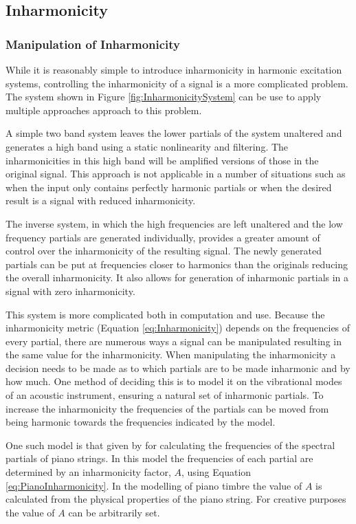 	\subsection{Inharmonicity}
	\label{sec:FeatureControl-Parameterisation-Inharmonicity}
		\subsubsection*{Manipulation of Inharmonicity}
			While it is reasonably simple to introduce inharmonicity in harmonic excitation systems,
			controlling the inharmonicity of a signal is a more complicated problem. The system shown in Figure
			\ref{fig:InharmonicitySystem} can be use to apply multiple approaches approach to this problem. 

			A simple two band system leaves the lower partials of the system unaltered and generates a high
			band using a static nonlinearity and filtering. The inharmonicities in this high band will be
			amplified versions of those in the original signal. This approach is not applicable in a number of
			situations such as when the input only contains perfectly harmonic partials or when the desired
			result is a signal with reduced inharmonicity.
			
			The inverse system, in which the high frequencies are left unaltered and the low frequency partials
			are generated individually, provides a greater amount of control over the inharmonicity of the
			resulting signal. The newly generated partials can be put at frequencies closer to harmonics than
			the originals reducing the overall inharmonicity. It also allows for generation of inharmonic
			partials in a signal with zero inharmonicity. 

			This system is more complicated both in computation and use. Because the inharmonicity metric
			(Equation \ref{eq:Inharmonicity}) depends on the frequencies of every partial, there are numerous
			ways a signal can be manipulated resulting in the same value for the inharmonicity. When
			manipulating the inharmonicity a decision needs to be made as to which partials are to be made
			inharmonic and by how much. One method of deciding this is to model it on the vibrational modes of
			an acoustic instrument, ensuring a natural set of inharmonic partials. To increase the
			inharmonicity the frequencies of the partials can be moved from being harmonic towards the
			frequencies indicated by the model.

			One such model is that given by \citet{rossing2002the} for calculating the frequencies of the
			spectral partials of piano strings. In this model the frequencies of each partial are determined by
			an inharmonicity factor, $A$, using Equation \ref{eq:PianoInharmonicity}. In the modelling of piano
			timbre the value of $A$ is calculated from the physical properties of the piano string. For
			creative purposes the value of $A$ can be arbitrarily set.

